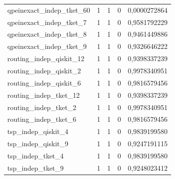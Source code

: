 \begin{longtable}{lrrrr}
qpeinexact\_indep\_tket\_60 & 1 & 1 & 0 & 0,0000272864 \\
qpeinexact\_indep\_tket\_7 & 1 & 1 & 0 & 0,9581792229 \\
qpeinexact\_indep\_tket\_8 & 1 & 1 & 0 & 0,9461449886 \\
qpeinexact\_indep\_tket\_9 & 1 & 1 & 0 & 0,9326646222 \\
routing\_indep\_qiskit\_12 & 1 & 1 & 0 & 0,9398337239 \\
routing\_indep\_qiskit\_2 & 1 & 1 & 0 & 0,9978340951 \\
routing\_indep\_qiskit\_6 & 1 & 1 & 0 & 0,9816579456 \\
routing\_indep\_tket\_12 & 1 & 1 & 0 & 0,9398337239 \\
routing\_indep\_tket\_2 & 1 & 1 & 0 & 0,9978340951 \\
routing\_indep\_tket\_6 & 1 & 1 & 0 & 0,9816579456 \\
tsp\_indep\_qiskit\_4 & 1 & 1 & 0 & 0,9839199580 \\
tsp\_indep\_qiskit\_9 & 1 & 1 & 0 & 0,9247191115 \\
tsp\_indep\_tket\_4 & 1 & 1 & 0 & 0,9839199580 \\
tsp\_indep\_tket\_9 & 1 & 1 & 0 & 0,9248023412 \\
\end{longtable}
\endgroup
